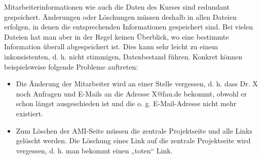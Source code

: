 \documentclass{bschlangaul-aufgabe}
\begin{document}
\begin{enumerate}
\begin{bAntwort}
Mitarbeiterinformationen wie auch die Daten des Kurses sind redundant
gespeichert. Änderungen oder Löschungen müssen deshalb in allen Dateien
erfolgen, in denen die entsprechenden Informationen gespeichert sind.
Bei vielen Dateien hat man aber in der Regel keinen Überblick, wo eine
bestimmte Information überall abgespeichert ist. Dies kann sehr leicht
zu einem inkonsistenten, d. h. nicht stimmigen, Datenbestand führen.
Konkret können beispielsweise folgende Probleme auftreten:

\begin{itemize}
\item Die Änderung der Mitarbeiter wird an einer Stelle vergessen, d. h.
dass \zB Dr. X noch Anfragen und E-Mails an die Adresse X@fau.de
bekommt, obwohl er schon längst ausgeschieden ist und die o. g.
E-Mail-Adresse nicht mehr existiert.

\item Zum Löschen der AMI-Seite müssen die zentrale Projektseite und
alle Links gelöscht werden. Die Löschung eines Link auf die zentrale
Projektseite wird vergessen, d. h. man bekommt einen „toten“ Link.
\end{itemize}
\end{bAntwort}
\end{enumerate}
\end{document}
